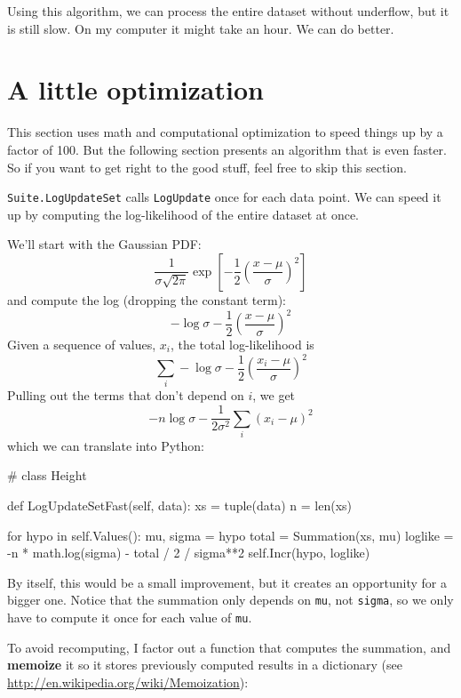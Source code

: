 \documentclass[12pt]{book}
\theoremstyle{exercise}
\begin{document}
Using this algorithm, we can process the entire dataset without
underflow, but it is still slow.  On my computer it might
take an hour.  We can do better.


\section{A little optimization}

This section uses math and computational optimization
to speed things up by a factor of 100.  But the following section
presents an algorithm that is even faster.  So if you want to
get right to the good stuff, feel free to skip this section.

{\tt Suite.LogUpdateSet} calls {\tt LogUpdate} once for each data
point.  We can speed it up by computing the log-likelihood of the entire
dataset at once.

We'll start with the Gaussian PDF:
%
\[ \frac{1}{\sigma \sqrt{2 \pi}} \exp \left[ -\frac{1}{2} \left( \frac{x-\mu}{\sigma} \right)^2 \right] \]
%
and compute the log (dropping the constant term):
%
\[ -\log \sigma -\frac{1}{2} \left( \frac{x-\mu}{\sigma} \right)^2 \]
%
Given a sequence of values, $x_i$, the total log-likelihood is
%
\[ \sum_i -\log \sigma - \frac{1}{2} \left( \frac{x_i-\mu}{\sigma} \right)^2 \]
%
Pulling out the terms that don't depend on $i$, we get
%
\[ -n \log \sigma - \frac{1}{2 \sigma^2} \sum_i (x_i - \mu)^2 \]
%
which we can translate into Python:

\begin{code}
# class Height

    def LogUpdateSetFast(self, data):
        xs = tuple(data)
        n = len(xs)

        for hypo in self.Values():
            mu, sigma = hypo
            total = Summation(xs, mu)
            loglike = -n * math.log(sigma) - total / 2 / sigma**2
            self.Incr(hypo, loglike)
\end{code}

By itself, this would be a small improvement, but it
creates an opportunity for a bigger one.  Notice that the
summation only depends on {\tt mu}, not {\tt sigma}, so we only
have to compute it once for each value of {\tt mu}.

To avoid recomputing, I factor out a function that computes the
summation, and {\bf memoize} it so it stores previously computed
results in a dictionary (see
\url{http://en.wikipedia.org/wiki/Memoization}): 
\end{document}
